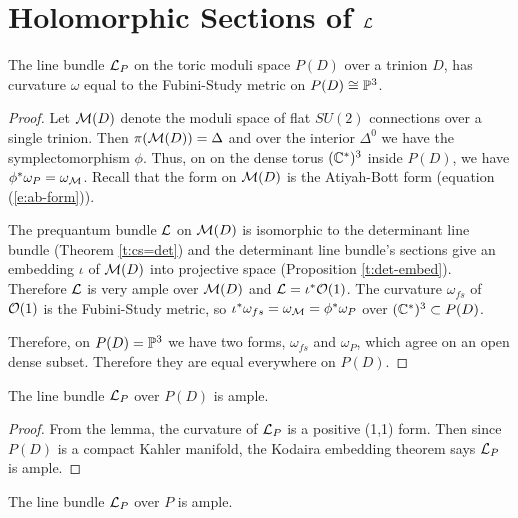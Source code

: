 \section{Holomorphic Sections of $\mathcal{L}$}
	\begin{lemma}
		The line bundle $\mathcal{L}_P$ on the toric moduli space $P(D)$ over a trinion $D$, has curvature $\omega$ equal to the Fubini-Study metric on $P(D) \cong \mathbb{P}^3$.
	\end{lemma}
	{\tiny }\begin{proof}
		Let $\mathcal{M}(D)$ denote the moduli space of flat $SU(2)$ connections over a single trinion. Then $\pi(\mathcal{M}(D)) = \Delta$ and over the interior $\Delta^{0}$ we have the symplectomorphism $\phi$. Thus, on on the dense torus $(\mathbb{C}^\ast)^3$ inside $P(D)$, we have $\phi^\ast \omega_P = \omega_{\mathcal{M}}$. Recall that the form on $\mathcal{M}(D)$ is the Atiyah-Bott form (equation (\ref{e:ab-form})).
		
		The prequantum bundle $\mathcal{L}$ on $\mathcal{M}(D)$ is isomorphic to the determinant line bundle (Theorem \ref{t:cs=det}) and the determinant line bundle's sections give an embedding $\iota$ of $\mathcal{M}(D)$ into projective space (Proposition \ref{t:det-embed}). Therefore $\mathcal{L}$ is very ample over $\mathcal{M}(D)$ and $\mathcal{L} = \iota^\ast \mathcal{O}(1)$. The curvature $\omega_{fs}$ of $\mathcal{O}(1)$ is the Fubini-Study metric, so $\iota^\ast \omega_{fs} = \omega_{\mathcal{M}} = \phi^\ast \omega_P$ over $(\mathbb{C}^\ast)^3 \subset P(D)$.
		
		Therefore, on $P(D) = \mathbb{P}^3$ we have two forms, $\omega_{fs}$ and $\omega_P$, which agree on an open dense subset. Therefore they are equal everywhere on $P(D)$.
	\end{proof}
	\begin{corollary}
		\label{t:P3-veryample}
		The line bundle $\mathcal{L}_P$ over $P(D)$ is ample.
	\end{corollary}
	\begin{proof}
		From the lemma, the curvature of $\mathcal{L}_P$ is a positive (1,1) form. Then since $P(D)$ is a compact Kahler manifold, the Kodaira embedding theorem says $\mathcal{L}_P$ is ample.
	\end{proof}
	\begin{theorem}
		\label{t:lp-ample}
		The line bundle $\mathcal{L}_P$ over $P$ is ample. 
	\end{theorem}
